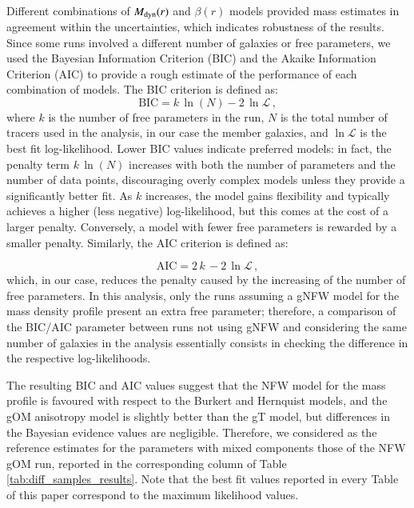 \documentclass{aa}
\begin{document}
Different combinations of $M_{\rm dyn}(r)$ and $\beta(r)$ models provided mass estimates in agreement within the uncertainties, which indicates robustness of the results. Since some runs involved a different number of galaxies or free parameters, we used the Bayesian Information Criterion (BIC) and the Akaike Information Criterion (AIC) to provide a rough estimate of the performance of each combination of models. The BIC criterion is defined as:
\begin{equation}
    \text{BIC} = k \, \ln(N) - 2 \, \ln\mathcal{L} \, ,
    \label{eq:BIC}
\end{equation}
where $k$ is the number of free parameters in the run, $N$ is the total number of tracers used in the analysis, in our case the member galaxies, and $\ln\mathcal{L}$ is the best fit log-likelihood. Lower BIC values indicate preferred models: in fact, the penalty term $k \, \ln(N)$ increases with both the number of parameters and the number of data points, discouraging overly complex models unless they provide a significantly better fit. As $k$ increases, the model gains flexibility and typically achieves a higher (less negative) log-likelihood, but this comes at the cost of a larger penalty. Conversely, a model with fewer free parameters is rewarded by a smaller penalty. Similarly, the AIC criterion is defined as:

\begin{equation}
    \text{AIC} = 2\,k \, - 2 \, \ln\mathcal{L} \, ,
    \label{eq:AIC}
\end{equation}
which, in our case, reduces the penalty caused by the increasing of the number of free parameters. In this analysis, only the runs assuming a gNFW model for the mass density profile present an extra free parameter; therefore, a comparison of the BIC/AIC parameter between runs not using gNFW and considering the same number of galaxies in the analysis essentially consists in checking the difference in the respective log-likelihoods.  

The resulting BIC and AIC values suggest that the NFW model for the mass profile is favoured with respect to the Burkert and Hernquist models, and the gOM anisotropy model is slightly better than the gT model, but differences in the Bayesian evidence values are negligible. Therefore, we considered as the reference estimates for the parameters with mixed components those of the NFW gOM run, reported in the corresponding column of Table \ref{tab:diff_samples_results}. Note that the best fit values reported in every Table of this paper correspond to the maximum likelihood values. %
 
\end{document}
